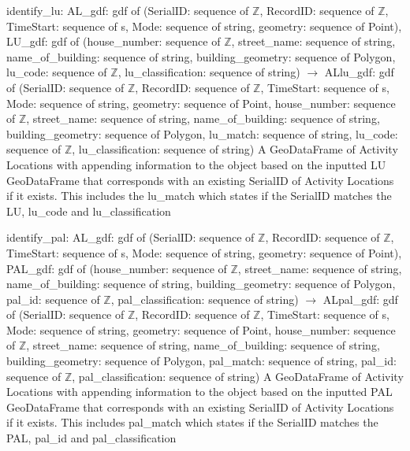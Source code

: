 \documentclass[12pt, titlepage]{article}
\begin{document}
identify\_lu: \newline
AL\_gdf: gdf of (SerialID: sequence of $\mathbb{Z}$, RecordID: sequence of $\mathbb{Z}$, TimeStart: sequence of s, Mode: sequence of string, geometry: sequence of Point), \newline \newline 
LU\_gdf: gdf of (house\_number: sequence of $\mathbb{Z}$, street\_name: sequence of string, name\_of\_building: sequence of string, building\_geometry: sequence of Polygon, lu\_code: sequence of $\mathbb{Z}$, lu\_classification: sequence of string)  \newline
$\rightarrow$
\newline
ALlu\_gdf: gdf of (SerialID: sequence of $\mathbb{Z}$, RecordID: sequence of $\mathbb{Z}$, TimeStart: sequence of s, Mode: sequence of string, geometry: sequence of Point, house\_number: sequence of $\mathbb{Z}$, street\_name: sequence of string, name\_of\_building: sequence of string, building\_geometry: sequence of Polygon, lu\_match: sequence of string, lu\_code: sequence of $\mathbb{Z}$, lu\_classification: sequence of string) 
\newline \newline
A GeoDataFrame of Activity Locations with appending information to the object based on the inputted LU GeoDataFrame that corresponds with an existing SerialID of Activity Locations if it exists. This includes the lu\_match which states if the SerialID matches the LU, lu\_code and lu\_classification
\newline 

\noindent identify\_pal: \newline
AL\_gdf: gdf of (SerialID: sequence of $\mathbb{Z}$, RecordID: sequence of $\mathbb{Z}$, TimeStart: sequence of s, Mode: sequence of string, geometry: sequence of Point), \newline \newline 
PAL\_gdf: gdf of (house\_number: sequence of $\mathbb{Z}$, street\_name: sequence of string, name\_of\_building: sequence of string, building\_geometry: sequence of Polygon, pal\_id: sequence of $\mathbb{Z}$, pal\_classification: sequence of string)\newline
$\rightarrow$
\newline
ALpal\_gdf: gdf of (SerialID: sequence of $\mathbb{Z}$, RecordID: sequence of $\mathbb{Z}$, TimeStart: sequence of s, Mode: sequence of string, geometry: sequence of Point, house\_number: sequence of $\mathbb{Z}$, street\_name: sequence of string, name\_of\_building: sequence of string, building\_geometry: sequence of Polygon, pal\_match: sequence of string, pal\_id: sequence of $\mathbb{Z}$, pal\_classification: sequence of string)
\newline \newline
A GeoDataFrame of Activity Locations with appending information to the object based on the inputted PAL GeoDataFrame that corresponds with an existing SerialID of Activity Locations if it exists. This includes  pal\_match which states if the SerialID matches the PAL, pal\_id and pal\_classification
\newpage
\end{document}
